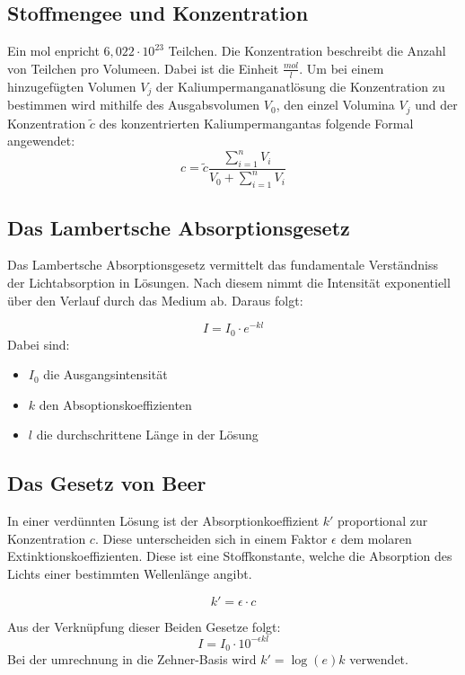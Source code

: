 \subsection{Stoffmengee und Konzentration}
Ein mol enpricht $6,022 \cdot 10^{23}$ Teilchen. Die Konzentration beschreibt die Anzahl von
Teilchen pro Volumeen. Dabei ist die Einheit $\tfrac{mol}{l}$.
Um bei einem hinzugefügten Volumen $V_j$ der Kaliumpermanganatlösung die Konzentration
zu bestimmen wird mithilfe des Ausgabsvolumen $V_0$, den einzel Volumina $V_j$ und der 
Konzentration $\tilde{c}$ des konzentrierten Kaliumpermangantas folgende Formal angewendet:
\begin{equation}
    c = \tilde{c} \frac{\sum_{i=1}^n V_i}{V_0 + \sum_{i=1}^n V_i}
    \label{eq:Konzentration}
\end{equation}

\subsection{Das Lambertsche Absorptionsgesetz}
Das Lambertsche Absorptionsgesetz vermittelt das fundamentale Verständniss der Lichtabsorption
in Lösungen. Nach diesem nimmt die Intensität exponentiell über den Verlauf durch das Medium ab.
Daraus folgt:

\begin{equation}
    I = I_0 \cdot e^{-kl}
\end{equation}
Dabei sind:
\begin{itemize}
    \item $I_0$ die Ausgangsintensität
    \item $k$ den Absoptionskoeffizienten
    \item $l$ die durchschrittene Länge in der Lösung
\end{itemize}


\subsection{Das Gesetz von Beer}
In einer verdünnten Lösung ist der Absorptionkoeffizient $k'$ proportional zur Konzentration $c$.
Diese unterscheiden sich in einem Faktor $\epsilon$ dem molaren Extinktionskoeffizienten. Diese
ist eine Stoffkonstante, welche die Absorption des Lichts einer bestimmten Wellenlänge angibt.

\begin{equation}
    k' = \epsilon \cdot c
    \label{eq:dekAbsorp}
\end{equation}

Aus der Verknüpfung dieser Beiden Gesetze folgt:
\begin{equation}
    I = I_0 \cdot 10^{-\epsilon k l}
\end{equation}
Bei der umrechnung in die Zehner-Basis wird $k' = \log(e) k$ verwendet.

